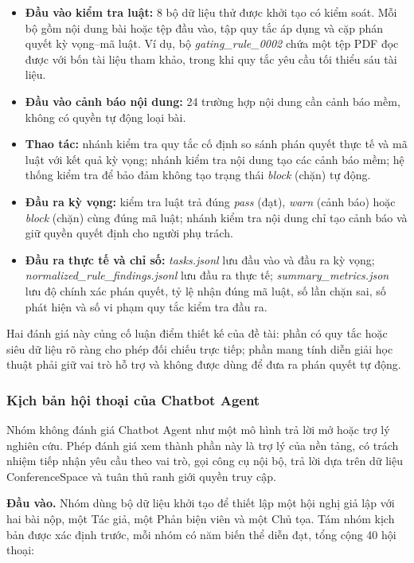 \begin{itemize}
  \item \textbf{Đầu vào kiểm tra luật:} 8 bộ dữ liệu thử được khởi tạo có kiểm soát. Mỗi bộ gồm nội dung bài hoặc tệp đầu vào, tập quy tắc áp dụng và cặp phán quyết kỳ vọng--mã luật. Ví dụ, bộ \textit{gating\_rule\_0002} chứa một tệp PDF đọc được với bốn tài liệu tham khảo, trong khi quy tắc yêu cầu tối thiểu sáu tài liệu.
  \item \textbf{Đầu vào cảnh báo nội dung:} 24 trường hợp nội dung cần cảnh báo mềm, không có quyền tự động loại bài.
  \item \textbf{Thao tác:} nhánh kiểm tra quy tắc cố định so sánh phán quyết thực tế và mã luật với kết quả kỳ vọng; nhánh kiểm tra nội dung tạo các cảnh báo mềm; hệ thống kiểm tra để bảo đảm không tạo trạng thái \textit{block} (chặn) tự động.
  \item \textbf{Đầu ra kỳ vọng:} kiểm tra luật trả đúng \textit{pass} (đạt), \textit{warn} (cảnh báo) hoặc \textit{block} (chặn) cùng đúng mã luật; nhánh kiểm tra nội dung chỉ tạo cảnh báo và giữ quyền quyết định cho người phụ trách.
  \item \textbf{Đầu ra thực tế và chỉ số:} \textit{tasks.jsonl} lưu đầu vào và đầu ra kỳ vọng; \textit{normalized\_rule\_findings.jsonl} lưu đầu ra thực tế; \textit{summary\_metrics.json} lưu độ chính xác phán quyết, tỷ lệ nhận đúng mã luật, số lần chặn sai, số phát hiện và số vi phạm quy tắc kiểm tra đầu ra.
\end{itemize}

Hai đánh giá này củng cố luận điểm thiết kế của đề tài: phần có quy tắc hoặc siêu dữ liệu rõ ràng cho phép đối chiếu trực tiếp; phần mang tính diễn giải học thuật phải giữ vai trò hỗ trợ và không được dùng để đưa ra phán quyết tự động.

\subsubsection{Kịch bản hội thoại của Chatbot Agent}

Nhóm không đánh giá Chatbot Agent như một mô hình trả lời mở hoặc trợ lý nghiên cứu. Phép đánh giá xem thành phần này là trợ lý của nền tảng, có trách nhiệm tiếp nhận yêu cầu theo vai trò, gọi công cụ nội bộ, trả lời dựa trên dữ liệu ConferenceSpace và tuân thủ ranh giới quyền truy cập.

\textbf{Đầu vào.} Nhóm dùng bộ dữ liệu khởi tạo để thiết lập một hội nghị giả lập với hai bài nộp, một Tác giả, một Phản biện viên và một Chủ tọa. Tám nhóm kịch bản được xác định trước, mỗi nhóm có năm biến thể diễn đạt, tổng cộng 40 hội thoại:

